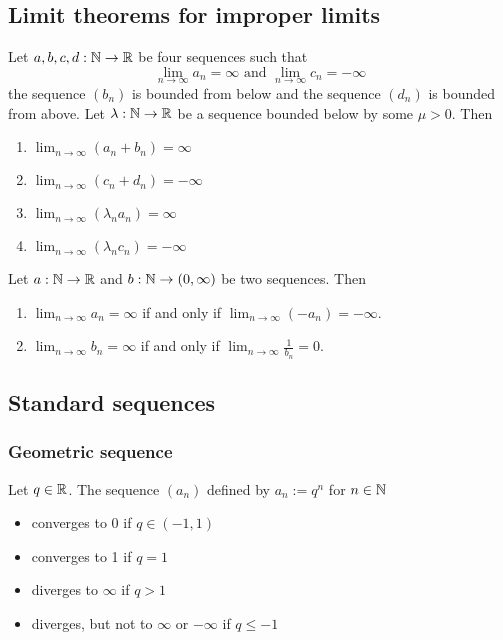\subsection{Limit theorems for improper limits}
\begin{theorem}
    Let $a,b,c,d: \mathbb{N} \to \mathbb{R}$ be four sequences such that
    $$\lim_{n\to\infty}a_n = \infty \text{ and } \lim_{n\to\infty}c_n = -\infty$$
    the sequence $(b_n)$ is bounded from below and the sequence $(d_n)$ is bounded from above. Let $\lambda: \mathbb{N} \to \mathbb{R}$ be a sequence bounded below by some $\mu > 0$. Then
    \begin{enumerate}[label=\roman*.]
        \item $\lim_{n\to\infty}(a_n + b_n) = \infty$
        \item $\lim_{n\to\infty}(c_n + d_n) = -\infty$
        \item $\lim_{n\to\infty}(\lambda_n a_n) = \infty$
        \item $\lim_{n\to\infty}(\lambda_n c_n) = -\infty$
    \end{enumerate}
\end{theorem}

\begin{proposition}
    Let $a: \mathbb{N} \to \mathbb{R}$ and $b: \mathbb{N} \to (0,\infty)$ be two sequences. Then
    \begin{enumerate}
        \item $\lim_{n\to\infty}a_n = \infty$ if and only if $\lim_{n\to\infty}(-a_n) = -\infty$.
        \item $\lim_{n\to\infty}b_n = \infty$ if and only if $\lim_{n\to\infty}\frac{1}{b_n} = 0$.
    \end{enumerate}
\end{proposition}

\subsection{Standard sequences}

\subsubsection{Geometric sequence}
\begin{proposition}
    Let $q \in \mathbb{R}$. The sequence $(a_n)$ defined by $a_n := q^n$ for $n \in \mathbb{N}$
    \begin{itemize}
        \item converges to 0 if $q \in (-1,1)$
        \item converges to 1 if $q = 1$
        \item diverges to $\infty$ if $q > 1$
        \item diverges, but not to $\infty$ or $-\infty$ if $q \le -1$
    \end{itemize}
\end{proposition}


